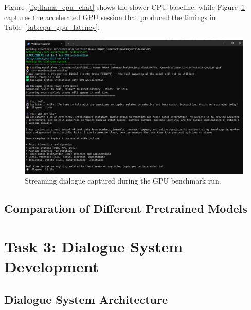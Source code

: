 \documentclass[12pt,a4paper]{article}
\begin{document}
Figure~\ref{fig:llama_cpu_chat} shows the slower CPU baseline, while Figure~\ref{fig:llama_gpu_chat} captures the accelerated GPU session that produced the timings in Table~\ref{tab:cpu_gpu_latency}.

\begin{figure}[H]
    \centering
    \includegraphics[width=1\linewidth]{Figures/llamaGPU.png}
    \caption{Streaming dialogue captured during the GPU benchmark run.}
    \label{fig:llama_gpu_chat}
\end{figure}

\subsection{Comparation of Different Pretrained Models}


\section{Task 3: Dialogue System Development}


\subsection{Dialogue System Architecture}

\end{document}
